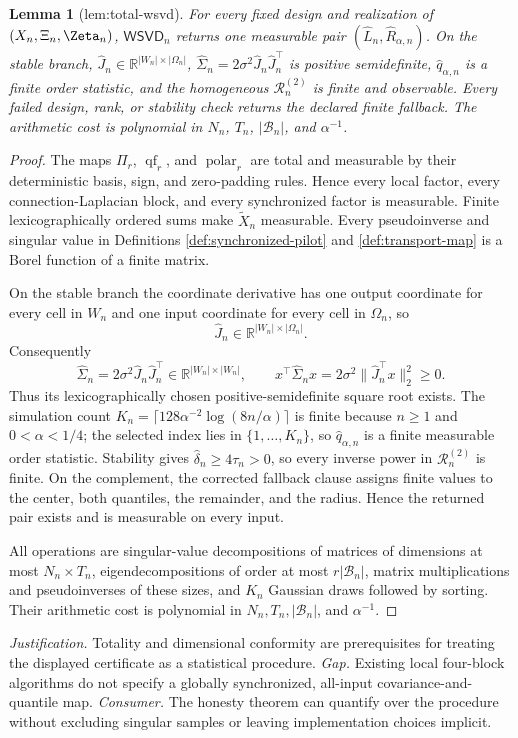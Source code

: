 \documentclass{article}
\newtheorem{lemma}{Lemma}
\begin{document}
\begin{lemma}[lem:total-wsvd]\label{lem:total-wsvd}
For every fixed design and realization of \((X_n,\Xi_n,\Zeta_n)\), \(\mathsf{WSVD}_n\) returns one measurable pair \((\widehat L_n,\widehat R_{\alpha,n})\). On the stable branch, \(\widehat J_n\in\mathbb R^{|W_n|\times|\Omega_n|}\), \(\widehat\Sigma_n=2\sigma^2\widehat J_n\widehat J_n^{\top}\) is positive semidefinite, \(\widehat q_{\alpha,n}\) is a finite order statistic, and the homogeneous \(\mathscr R_n^{(2)}\) is finite and observable. Every failed design, rank, or stability check returns the declared finite fallback. The arithmetic cost is polynomial in \(N_n\), \(T_n\), \(|\mathcal B_n|\), and \(\alpha^{-1}\).
\end{lemma}
\begin{proof}
The maps \(\Pi_r\), \(\operatorname{qf}_r\), and \(\operatorname{polar}_r\) are total and measurable by their deterministic basis, sign, and zero-padding rules. Hence every local factor, every connection-Laplacian block, and every synchronized factor is measurable. Finite lexicographically ordered sums make \(\widetilde X_n\) measurable. Every pseudoinverse and singular value in Definitions \ref{def:synchronized-pilot} and \ref{def:transport-map} is a Borel function of a finite matrix.

On the stable branch the coordinate derivative has one output coordinate for every cell in \(W_n\) and one input coordinate for every cell in \(\Omega_n\), so
\[
\widehat J_n\in\mathbb R^{|W_n|\times|\Omega_n|}.
\]
Consequently
\[
\widehat\Sigma_n=2\sigma^2\widehat J_n\widehat J_n^{\top}
\in\mathbb R^{|W_n|\times|W_n|},
\qquad
x^{\top}\widehat\Sigma_nx
=2\sigma^2\|\widehat J_n^{\top}x\|_2^2\ge0.
\]
Thus its lexicographically chosen positive-semidefinite square root exists. The simulation count
\(K_n=\lceil128\alpha^{-2}\log(8n/\alpha)\rceil\) is finite because \(n\ge1\) and \(0<\alpha<1/4\); the selected index lies in \(\{1,\ldots,K_n\}\), so \(\widehat q_{\alpha,n}\) is a finite measurable order statistic. Stability gives \(\widehat\delta_n\ge4\tau_n>0\), so every inverse power in \(\mathscr R_n^{(2)}\) is finite. On the complement, the corrected fallback clause assigns finite values to the center, both quantiles, the remainder, and the radius. Hence the returned pair exists and is measurable on every input.

All operations are singular-value decompositions of matrices of dimensions at most \(N_n\times T_n\), eigendecompositions of order at most \(r|\mathcal B_n|\), matrix multiplications and pseudoinverses of these sizes, and \(K_n\) Gaussian draws followed by sorting. Their arithmetic cost is polynomial in \(N_n,T_n,|\mathcal B_n|\), and \(\alpha^{-1}\).
\end{proof}
\par\smallskip\noindent \textit{Justification.} Totality and dimensional conformity are prerequisites for treating the displayed certificate as a statistical procedure. \textit{Gap.} Existing local four-block algorithms do not specify a globally synchronized, all-input covariance-and-quantile map. \textit{Consumer.} The honesty theorem can quantify over the procedure without excluding singular samples or leaving implementation choices implicit.
\end{document}
